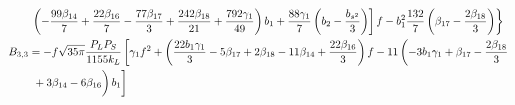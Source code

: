 \begin{align}
&\left.\left. \left( -\frac{99 \beta_{14}}{7}+\frac{22 \beta_{16}}{7}-\frac{77 \beta_{17}}{3}+\frac{242 \beta_{18}}{21}+\frac{792 \gamma_1}{49}\right) b_{1}+ \frac{88 \gamma_1}{7} \left( b_{2}-\frac{b_{s^2}}{3}\right) \right] f - b_1^2 \frac{132}{7} \left(\beta_{17}-\frac{2 \beta_{18}}{3}\right)  \right\}\\
%
%
B_{3,3} &=-f \sqrt{35 \pi}\frac{P_L P_S}{1155 k_{L}} \left[\gamma_1 f^{2}+\left(\frac{22 b_{1} \gamma_1}{3}-5 \beta_{17}+2 \beta_{18}-11 \beta_{14}+\frac{22 \beta_{16}}{3}\right) f-11\left(-3 b_{1} \gamma_1+\beta_{17}-\frac{2 \beta_{18}}{3}\right.\right.\nonumber\\
& \left.\left. \vphantom{\frac{b_{s^2}}{3}}+3 \beta_{14}-6 \beta_{16}\right) b_{1}\right]  
%
\end{align}